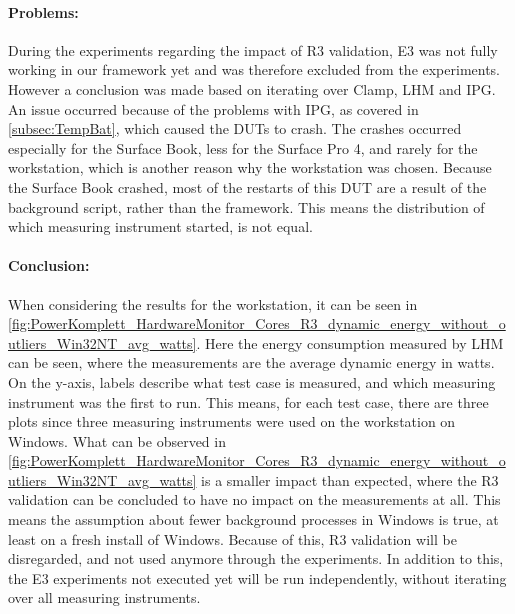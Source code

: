 \paragraph{Problems:} During the experiments regarding the impact of R3 validation, E3 was not fully working in our framework yet and was therefore excluded from the experiments. However a conclusion was made based on iterating over Clamp, LHM and IPG. An issue occurred because of the problems with IPG, as covered in \cref{subsec:TempBat}, which caused the DUTs to crash. The crashes occurred especially for the Surface Book, less for the Surface Pro 4, and rarely for the workstation, which is another reason why the workstation was chosen. Because the Surface Book crashed, most of the restarts of this DUT are a result of the background script, rather than the framework. This means the distribution of which measuring instrument started, is not equal.

\paragraph{Conclusion:} When considering the results for the workstation, it can be seen in \cref{fig:PowerKomplett_HardwareMonitor_Cores_R3_dynamic_energy_without_outliers_Win32NT_avg_watts}. Here the energy consumption measured by LHM can be seen, where the measurements are the average dynamic energy in watts. On the y-axis, labels describe what test case is measured, and which measuring instrument was the first to run. This means, for each test case, there are three plots since three measuring instruments were used on the workstation on Windows. What can be observed in \cref{fig:PowerKomplett_HardwareMonitor_Cores_R3_dynamic_energy_without_outliers_Win32NT_avg_watts} is a smaller impact than expected, where the R3 validation can be concluded to have no impact on the measurements at all. This means the assumption about fewer background processes in Windows is true, at least on a fresh install of Windows. Because of this, R3 validation will be disregarded, and not used anymore through the experiments. In addition to this, the E3 experiments not executed yet will be run independently, without iterating over all measuring instruments.
